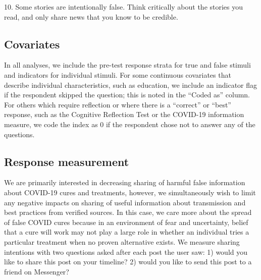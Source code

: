 \documentclass[letterpaper, 12pt, parskip=full,DIV=10]{scrartcl}
\begin{document}
10. Some stories are intentionally false. Think critically about the stories you read, and only share news that you know to be credible.


\subsection{Covariates}
\label{section:covariates}

In all analyses, we include the pre-test response strata for true and false stimuli and indicators for individual stimuli. For some continuous covariates that describe individual characteristics, such as education, we include an indicator flag if the respondent skipped the question; this is noted in the ``Coded as'' column. For others which require reflection or where there is a ``correct'' or ``best'' response, such as the Cognitive Reflection Test or the COVID-19 information measure, we code the index as 0 if the respondent chose not to answer any of the questions. 





\subsection{Response measurement}

We  are  primarily  interested  in  decreasing  sharing  of  harmful  false  information  about COVID-19 cures and treatments, however, we simultaneously wish to limit any negative impacts on sharing of useful information about transmission and best practices from verified sources.  In this case,  we care more about the spread of false COVID cures because in an environment of fear and uncertainty, belief that a cure will work may not play a large role in whether an individual tries a particular treatment when no proven alternative exists. We measure sharing intentions with two questions asked after each post the user saw: 1) would you like to share this post on your timeline? 2) would you like to send this post to a friend on Messenger? 
\end{document}

